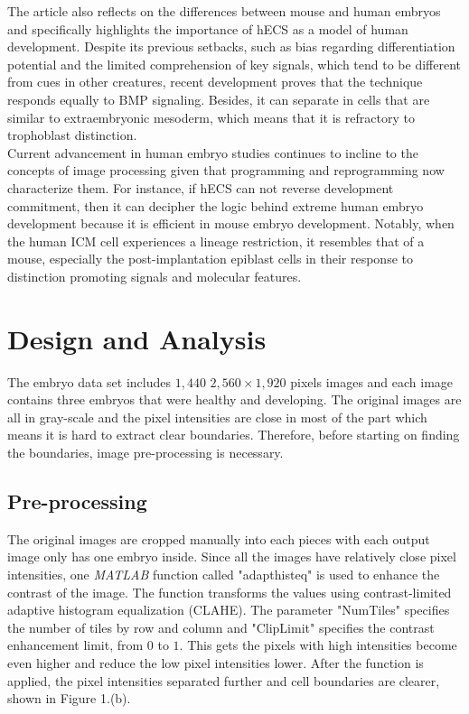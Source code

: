 \documentclass[12pt]{article}
\begin{document}
\noindent \qquad The article also reflects on the differences between mouse and human embryos and specifically highlights the importance of hECS as a model of human development. Despite its previous setbacks, such as bias regarding differentiation potential and the limited comprehension of key signals, which tend to be different from cues in other creatures, recent development proves that the technique responds equally to BMP signaling. Besides, it can separate in cells that are similar to extraembryonic mesoderm, which means that it is refractory to trophoblast distinction. \\

\noindent \qquad Current advancement in human embryo studies continues to incline to the concepts of image processing given that programming and reprogramming now characterize them. For instance, if hECS can not reverse development commitment, then it can decipher the logic behind extreme human embryo development because it is efficient in mouse embryo development. Notably, when the human ICM cell experiences a lineage restriction, it resembles that of a mouse, especially the post-implantation epiblast cells in their response to distinction promoting signals and molecular features. \\

\newpage \section{Design and Analysis}

\qquad The embryo data set includes $1,440$ $2,560 \times 1,920$ pixels images and each image contains three embryos that were healthy and developing. The original images are all in gray-scale and the pixel intensities are close in most of the part which means it is hard to extract clear boundaries. Therefore, before starting on finding the boundaries, image pre-processing is necessary. 

\subsection{Pre-processing}
	
\noindent \qquad The original images are cropped manually into each pieces with each output image only has one embryo inside. Since all the images have relatively close pixel intensities, one \textit{MATLAB} function called "adapthisteq" is used to enhance the contrast of the image. The function transforms the values using contrast-limited adaptive histogram equalization (CLAHE). The parameter "NumTiles" specifies the number of tiles by row and column and "ClipLimit" specifies the contrast enhancement limit, from $0$ to $1$. This gets the pixels with high intensities become even higher and reduce the low pixel intensities lower. After the function is applied, the pixel intensities separated further and cell boundaries are clearer, shown in Figure 1.(b).\\
\end{document}
